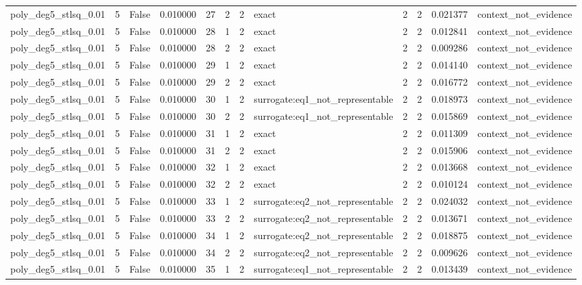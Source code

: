 \begin{tabular}{lrrrrrrlrrrl}
poly\_deg5\_stlsq\_0.01 & 5 & False & 0.010000 & 27 & 2 & 2 & exact & 2 & 2 & 0.021377 & context\_not\_evidence \\
poly\_deg5\_stlsq\_0.01 & 5 & False & 0.010000 & 28 & 1 & 2 & exact & 2 & 2 & 0.012841 & context\_not\_evidence \\
poly\_deg5\_stlsq\_0.01 & 5 & False & 0.010000 & 28 & 2 & 2 & exact & 2 & 2 & 0.009286 & context\_not\_evidence \\
poly\_deg5\_stlsq\_0.01 & 5 & False & 0.010000 & 29 & 1 & 2 & exact & 2 & 2 & 0.014140 & context\_not\_evidence \\
poly\_deg5\_stlsq\_0.01 & 5 & False & 0.010000 & 29 & 2 & 2 & exact & 2 & 2 & 0.016772 & context\_not\_evidence \\
poly\_deg5\_stlsq\_0.01 & 5 & False & 0.010000 & 30 & 1 & 2 & surrogate:eq1\_not\_representable & 2 & 2 & 0.018973 & context\_not\_evidence \\
poly\_deg5\_stlsq\_0.01 & 5 & False & 0.010000 & 30 & 2 & 2 & surrogate:eq1\_not\_representable & 2 & 2 & 0.015869 & context\_not\_evidence \\
poly\_deg5\_stlsq\_0.01 & 5 & False & 0.010000 & 31 & 1 & 2 & exact & 2 & 2 & 0.011309 & context\_not\_evidence \\
poly\_deg5\_stlsq\_0.01 & 5 & False & 0.010000 & 31 & 2 & 2 & exact & 2 & 2 & 0.015906 & context\_not\_evidence \\
poly\_deg5\_stlsq\_0.01 & 5 & False & 0.010000 & 32 & 1 & 2 & exact & 2 & 2 & 0.013668 & context\_not\_evidence \\
poly\_deg5\_stlsq\_0.01 & 5 & False & 0.010000 & 32 & 2 & 2 & exact & 2 & 2 & 0.010124 & context\_not\_evidence \\
poly\_deg5\_stlsq\_0.01 & 5 & False & 0.010000 & 33 & 1 & 2 & surrogate:eq2\_not\_representable & 2 & 2 & 0.024032 & context\_not\_evidence \\
poly\_deg5\_stlsq\_0.01 & 5 & False & 0.010000 & 33 & 2 & 2 & surrogate:eq2\_not\_representable & 2 & 2 & 0.013671 & context\_not\_evidence \\
poly\_deg5\_stlsq\_0.01 & 5 & False & 0.010000 & 34 & 1 & 2 & surrogate:eq2\_not\_representable & 2 & 2 & 0.018875 & context\_not\_evidence \\
poly\_deg5\_stlsq\_0.01 & 5 & False & 0.010000 & 34 & 2 & 2 & surrogate:eq2\_not\_representable & 2 & 2 & 0.009626 & context\_not\_evidence \\
poly\_deg5\_stlsq\_0.01 & 5 & False & 0.010000 & 35 & 1 & 2 & surrogate:eq1\_not\_representable & 2 & 2 & 0.013439 & context\_not\_evidence \\

\end{tabular}

